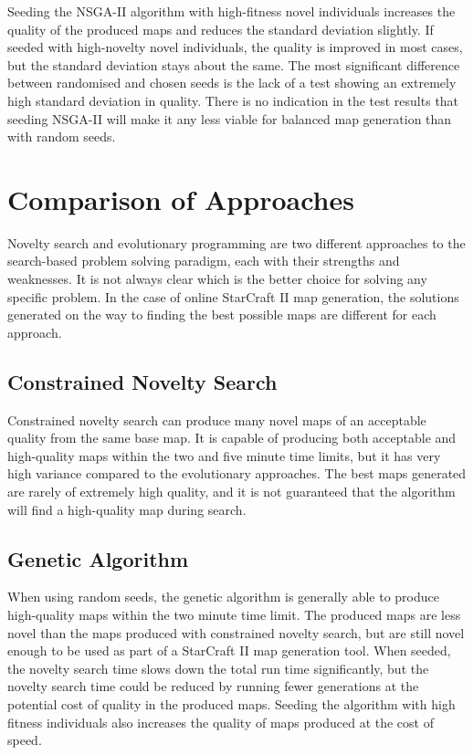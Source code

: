 Seeding the NSGA-II algorithm with high-fitness novel individuals increases the quality of the produced maps and reduces the standard deviation slightly. If seeded with high-novelty novel individuals, the quality is improved in most cases, but the standard deviation stays about the same. The most significant difference between randomised and chosen seeds is the lack of a test showing an extremely high standard deviation in quality. There is no indication in the test results that seeding NSGA-II will make it any less viable for balanced map generation than with random seeds. 

\section{Comparison of Approaches}
\label{discussion_comparison}
Novelty search and evolutionary programming are two different approaches to the search-based problem solving paradigm, each with their strengths and weaknesses. It is not always clear which is the better choice for solving any specific problem. In the case of online StarCraft II map generation, the solutions generated on the way to finding the best possible maps are different for each approach.

\subsection{Constrained Novelty Search}
\label{discussion_comparison_constrainednoveltysearch}
Constrained novelty search can produce many novel maps of an acceptable quality from the same base map. It is capable of producing both acceptable and high-quality maps within the two and five minute time limits, but it has very high variance compared to the evolutionary approaches. The best maps generated are rarely of extremely high quality, and it is not guaranteed that the algorithm will find a high-quality map during search.

\subsection{Genetic Algorithm}
\label{discussion_comparison_geneticalgorithm}
When using random seeds, the genetic algorithm is generally able to produce high-quality maps within the two minute time limit. The produced maps are less novel than the maps produced with constrained novelty search, but are still novel enough to be used as part of a StarCraft II map generation tool. When seeded, the novelty search time slows down the total run time significantly, but the novelty search time could be reduced by running fewer generations at the potential cost of quality in the produced maps. Seeding the algorithm with high fitness individuals also increases the quality of maps produced at the cost of speed.

